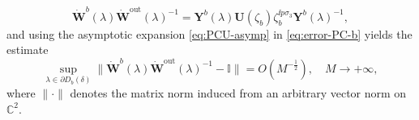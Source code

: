\begin{equation}
\dot{\mathbf{W}}^b(\lambda)\dot{\mathbf{W}}^{\mathrm{out}}(\lambda)^{-1}
=\mathbf{Y}^b(\lambda)\mathbf{U}(\zeta_b) \zeta_b^{\ii p \sigma_3}\mathbf{Y}^b(\lambda)^{-1},
\label{eq:error-PC-b}
\end{equation}
and using the asymptotic expansion \eqref{eq:PCU-asymp} in \eqref{eq:error-PC-b} yields the estimate
\begin{equation}
\sup_{\lambda\in \partial D_b(\delta)}\| \dot{\mathbf{W}}^b(\lambda)\dot{\mathbf{W}}^{\mathrm{out}}(\lambda)^{-1} -\mathbb{I} \| = O(M^{-\frac{1}{2}}),\quad M\to+\infty,
\label{eq:error-PC-disk-b-large-M}
\end{equation}
where $\| \cdot \|$ denotes the matrix norm induced from an arbitrary vector norm on $\mathbb{C}^2$.


